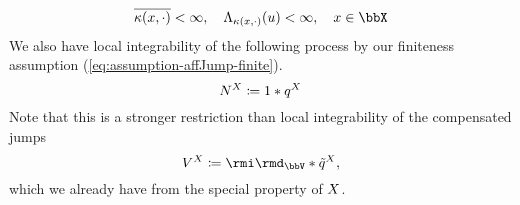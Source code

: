 \begin{equation*}
  \overline{\affDist(\stateVar, \cdot)} < \infty, \quad \ode_{\affDist(\stateVar, \cdot)}(\momentVar) < \infty, \quad \stateVar \in \stateSpace
\end{equation*}
We also have local integrability of the following process by our finiteness assumption (\ref{eq:assumption-affJump-finite}).
\begin{equation}
  \label{eq:arrivals}
  N^X \coloneqq 1 \ast q^X
\end{equation}
Note that this is a stronger restriction than local integrability of the compensated jumps
\begin{equation}
  \label{eq:jumps}
  \V^\X \defeq \id_\vecSpace \ast \compensate{\jumpMeas^\X},
\end{equation}
which we already have from the special property of $X$.

